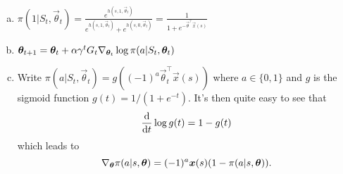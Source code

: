 \begin{enumerate}[a)]
    \item $\pi(1 \vert{} S_t, \vec{\theta}_t) = \frac{e^{h(s, 1, \vec{\theta}_t)}}{e^{h(s, 1, \vec{\theta}_t)} + e^{h(s, 0, \vec{\theta}_t)}} = \frac{1}{1 + e^{-\vec{\theta}^\top\vec{x}(s)}}$
    \item $\boldsymbol{\theta}_{t+1} = \boldsymbol{\theta}_t + \alpha \gamma^t G_t \nabla_{\boldsymbol{\theta}_t}\log\pi(a \vert{} S_t, \boldsymbol{\theta}_t)$ 
    \item Write $\pi(a \vert{} S_t, \vec{\theta}_t) = g((-1)^a \vec{\theta}_t^\top\vec{x}(s))$ where $a \in \{ 0, 1\}$ and $g$ is the sigmoid function $g(t) = 1 / (1 + e^{-t})$. It's then quite easy to see that 
    \[
        \frac{\mathrm{d}{}}{\mathrm{d}{} t} \log g(t) = 1 - g(t)
    \]
    which leads to
    \[
        \nabla_{\boldsymbol{\theta}} \pi(a \vert{} s, \boldsymbol{\theta}) = (-1)^a \boldsymbol{x}(s) (1 - \pi(a \vert{} s, \boldsymbol{\theta})).
    \]
\end{enumerate}